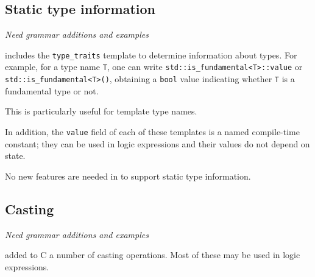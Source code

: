 \subsection{Static type information}

\emph{Need grammar additions and examples}

\lang{} includes the \lstinline|type_traits| template to determine information about types.
For example, for a type name \lstinline|T|, one can write
\lstinline|std::is_fundamental<T>::value| or
\lstinline|std::is_fundamental<T>()|, obtaining a 
\lstinline|bool| value indicating whether 
\lstinline|T| is a fundamental type or not.

This is particularly useful for template type names.

In addition, the \lstinline|value| field of each of these templates is a named \lang{} compile-time constant; they can be used in logic expressions and their values do not depend on state.

No new features are needed in \NAME{} to support static type information. 


\subsection{Casting}

\emph{Need grammar additions and examples}



\lang{} added to C a number of casting operations. Most of these may be 
used in logic expressions.

